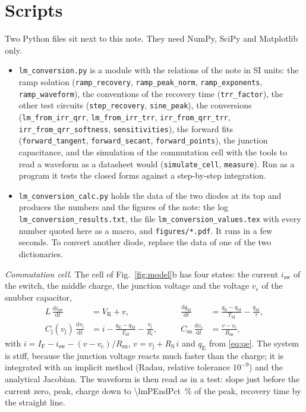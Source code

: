 \documentclass[10pt,a4paper]{scrartcl}
\newcommand{\IF}{I_\mathrm{F}}
\newcommand{\VR}{V_\mathrm{R}}
\newcommand{\TM}{T_\mathrm{M}}
\newcommand{\qE}{q_\mathrm{E}}
\newcommand{\qM}{q_\mathrm{M}}
\newcommand{\vj}{v_\mathrm{j}}
\newcommand{\RS}{R_\mathrm{S}}
\newcommand{\Rr}{R_\mathrm{r}}
\newcommand{\Cj}{C_\mathrm{j}}
\newcommand{\Csn}{C_\mathrm{sn}}
\newcommand{\Rsn}{R_\mathrm{sn}}
\newcommand{\diff}{\mathrm{d}}
\begin{document}
\section{Scripts}
\label{app:scripts}
Two Python files sit next to this note. They need NumPy, SciPy and Matplotlib only.
\begin{itemize}
\emergencystretch=3em
\item \texttt{lm\_conversion.py} is a module with the relations of the note in SI units: the ramp solution (\texttt{ramp\_recovery}, \texttt{ramp\_peak\_norm}, \texttt{ramp\_exponents}, \texttt{ramp\_waveform}), the conventions of the recovery time (\texttt{trr\_factor}), the other test circuits (\texttt{step\_recovery}, \texttt{sine\_peak}), the conversions (\texttt{lm\_from\_irr\_qrr}, \texttt{lm\_from\_irr\_trr}, \texttt{irr\_from\_qrr\_trr}, \texttt{irr\_from\_qrr\_softness}, \texttt{sensitivities}), the forward fits (\texttt{forward\_tangent}, \texttt{forward\_secant}, \texttt{forward\_points}), the junction capacitance, and the simulation of the commutation cell with the tools to read a waveform as a datasheet would (\texttt{simulate\_cell}, \texttt{measure}). Run as a program it tests the closed forms against a step-by-step integration.
\item \texttt{lm\_conversion\_calc.py} holds the data of the two diodes at its top and produces the numbers and the figures of the note: the log \texttt{lm\_conversion\_results.txt}, the file \texttt{lm\_conversion\_values.tex} with every number quoted here as a macro, and \texttt{figures/*.pdf}. It runs in a few seconds. To convert another diode, replace the data of one of the two dictionaries.
\end{itemize}

\emph{Commutation cell.} The cell of Fig.~\ref{fig:model}b has four states: the current $i_\mathrm{sw}$ of the switch, the middle charge, the junction voltage and the voltage $v_\mathrm{c}$ of the snubber capacitor,
\begin{equation}
\begin{aligned}
L\,\frac{\diff i_\mathrm{sw}}{\diff t} &= \VR + v , &\qquad \frac{\diff\qM}{\diff t} &= \frac{\qE-\qM}{\TM} - \frac{\qM}{\tau} , \\
\Cj(\vj)\,\frac{\diff\vj}{\diff t} &= i - \frac{\qE-\qM}{\TM} - \frac{\vj}{\Rr} , &\qquad \Csn\,\frac{\diff v_\mathrm{c}}{\diff t} &= \frac{v - v_\mathrm{c}}{\Rsn} ,
\end{aligned}
\end{equation}
with $i = \IF - i_\mathrm{sw} - (v-v_\mathrm{c})/\Rsn$, $v = \vj + \RS\,i$ and $\qE$ from \eqref{eq:qe}. The system is stiff, because the junction voltage reacts much faster than the charge; it is integrated with an implicit method (Radau, relative tolerance $10^{-9}$) and the analytical Jacobian. The waveform is then read as in a test: slope just before the current zero, peak, charge down to \SI{\lmPEndPct}{\percent} of the peak, recovery time by the straight line.
\end{document}
